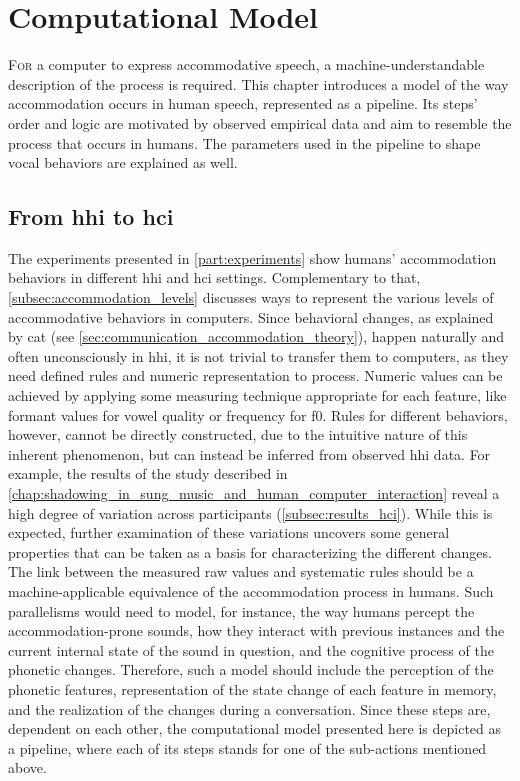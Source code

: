 \chapter[Computational Model]{Computational Model}
\label{chap:computational_model}

\lettrine{F}{or} a computer to express accommodative speech, a machine-understandable description of the process is required.
This chapter introduces a model of the way accommodation occurs in human speech, represented as a pipeline.
Its steps' order and logic are motivated by observed empirical data and aim to resemble the process that occurs in humans.
The parameters used in the pipeline to shape vocal behaviors are explained as well.

\pagebreak

\acresetall

\section{From \acs{hhi} to \acs{hci}}
\label{sec:from_hhi_to_hci}

The experiments presented in \cref{part:experiments} show humans' accommodation behaviors in different \ac{hhi} and \ac{hci} settings.
Complementary to that, \cref{subsec:accommodation_levels} discusses ways to represent the various levels of accommodative behaviors in computers.
Since behavioral changes, as explained by \ac{cat} (see \cref{sec:communication_accommodation_theory}), happen naturally and often unconsciously in \ac{hhi}, it is not trivial to transfer them to computers, as they need defined rules and numeric representation to process.
Numeric values can be achieved by applying some measuring technique appropriate for each feature, like formant values for vowel quality or frequency for \ac{f0}.
Rules for different behaviors, however, cannot be directly constructed, due to the intuitive nature of this inherent phenomenon, but can instead be inferred from observed \ac{hhi} data.
For example, the results of the study described in \cref{chap:shadowing_in_sung_music_and_human_computer_interaction} reveal a high degree of variation across participants (\cref{subsec:results_hci}).
While this is expected, further examination of these variations uncovers some general properties that can be taken as a basis for characterizing the different changes.
The link between the measured raw values and systematic rules should be a machine-applicable equivalence of the accommodation process in humans.
Such parallelisms would need to model, for instance, the way humans percept the accommodation-prone sounds, how they interact with previous instances and the current internal state of the sound in question, and the cognitive process of the phonetic changes.
Therefore, such a model should include the perception of the phonetic features, representation of the state change of each feature in memory, and the realization of the changes during a conversation.
Since these steps are, dependent on each other, the computational model presented here is depicted as a pipeline, where each of its steps stands for one of the sub-actions mentioned above.


